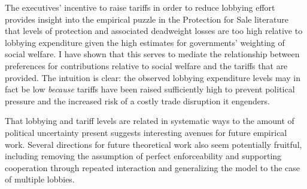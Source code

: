 \documentclass[10pt]{article}
\begin{document}
The executives' incentive to raise tariffs in order to reduce lobbying effort provides insight into the empirical puzzle in the Protection for Sale literature that levels of protection and associated deadweight losses are too high relative to lobbying expenditure given the high estimates for governments' weighting of social welfare. I have shown that this serves to mediate the relationship between preferences for contributions relative to social welfare and the tariffs that are provided. The intuition is clear: the observed lobbying expenditure levels may in fact be low \textit{because} tariffs have been raised sufficiently high to prevent political pressure and the increased risk of a costly trade disruption it engenders.

That lobbying and tariff levels are related in systematic ways to the amount of political uncertainty present suggests interesting avenues for future empirical work. Several directions for future theoretical work also seem potentially fruitful, including removing the assumption of perfect enforceability and supporting cooperation through repeated interaction and generalizing the model to the case of multiple lobbies.

			



\end{document}
